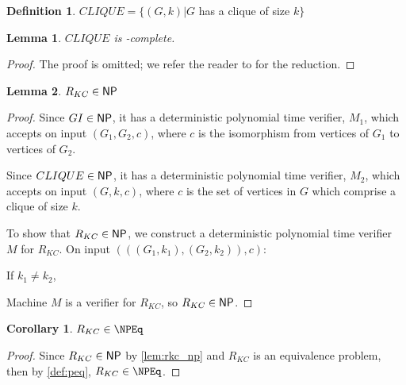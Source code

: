 \documentclass{article}
\newtheorem{lemma}[lemma]{Lemma}
\newtheorem{corollary}[corollary]{Corollary}
\theoremstyle{definition} \newtheorem{definition}[definition]{Definition}
\begin{document}
\begin{definition}
  $CLIQUE=\{(G,k)|G$ has a clique of size $k\}$
\end{definition}

\begin{lemma}$CLIQUE$ is \NP-complete.\end{lemma}
\begin{proof}
  The proof is omitted; we refer the reader to \cite{gj79} for the reduction.
\end{proof}

\begin{lemma}\label{lem:rkc_np}$R_{KC}\in{\ensuremath{\mathsf{NP}}}$\end{lemma}
\begin{proof}
  Since $GI\in{\ensuremath{\mathsf{NP}}}$, it has a deterministic polynomial time verifier, $M_1$,
  which accepts on input $(G_1, G_2, c)$, where $c$ is the isomorphism from
  vertices of $G_1$ to vertices of $G_2$.

  Since $CLIQUE\in{\ensuremath{\mathsf{NP}}}$, it has a deterministic polynomial time verifier, $M_2$,
  which accepts on input $(G, k, c)$, where $c$ is the set of vertices in $G$
  which comprise a clique of size $k$.

  To show that $R_{KC}\in{\ensuremath{\mathsf{NP}}}$, we construct a deterministic polynomial time
  verifier $M$ for $R_{KC}$. On input $(((G_1, k_1), (G_2, k_2)), c)$:\\
  \begin{algorithm}[H]
    If $k_1\neq k_2$, \REJECT\;
  \end{algorithm}
  
  Machine $M$ is a verifier for $R_{KC}$, so $R_{KC}\in{\ensuremath{\mathsf{NP}}}$.
\end{proof}

\begin{corollary}\label{cor:rkc_npeq}$R_{KC}\in\NPEq$\end{corollary}
\begin{proof}
  Since $R_{KC}\in{\ensuremath{\mathsf{NP}}}$ by \autoref{lem:rkc_np} and $R_{KC}$ is an equivalence
  problem, then by \autoref{def:peq}, $R_{KC}\in\NPEq$.
\end{proof}
\end{document}
